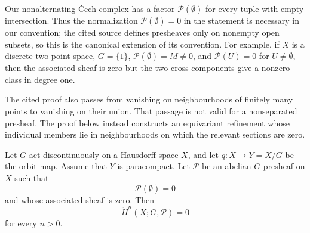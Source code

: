 \begin{lemma}
\label{lemma-equivariant-cech-zero-associated-sheaf}
\begin{reference}
\cite[Chapter V, \S 5.5, Lemma 5.5.5, pp. 212--213]{Tohoku}
\end{reference}
\begin{history}
Our nonalternating \v Cech complex has a factor
$\mathcal P(\emptyset)$ for every tuple with empty intersection. Thus the
normalization $\mathcal P(\emptyset)=0$ in the statement is necessary in
our convention; the cited source defines presheaves only on nonempty open
subsets, so this is the canonical extension of its convention. For
example, if $X$ is a discrete two point space,
$G=\{1\}$, $\mathcal P(\emptyset)=M\neq 0$, and
$\mathcal P(U)=0$ for $U\neq\emptyset$, then the associated sheaf is zero
but the two cross components give a nonzero class in degree one.

The cited proof also passes from vanishing on neighbourhoods of finitely
many points to vanishing on their union. That passage is not valid for a
nonseparated presheaf. The proof below instead constructs an equivariant
refinement whose individual members lie in neighbourhoods on which the
relevant sections are zero.
\end{history}
Let $G$ act discontinuously on a Hausdorff space $X$, and let
$q:X\to Y=X/G$ be the orbit map. Assume that $Y$ is paracompact. Let
$\mathcal P$ be an abelian $G$-presheaf on $X$ such that
$$
\mathcal P(\emptyset)=0
$$
and whose associated sheaf is zero. Then
$$
\check H^n(X;G,\mathcal P)=0
$$
for every $n>0$.
\end{lemma}

